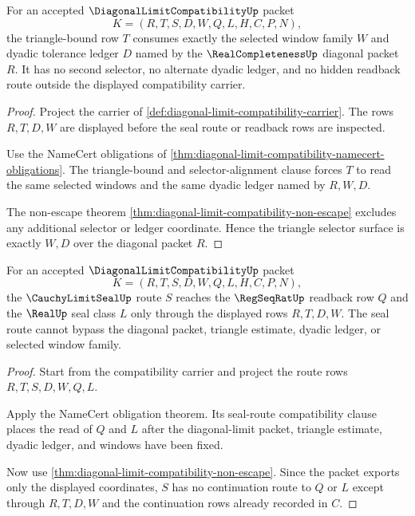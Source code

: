 

\begin{theorem}
\label{thm:diagonal-limit-compatibility-triangle-selector-alignment}
For an accepted $\DiagonalLimitCompatibilityUp$ packet
$$
K=(R,T,S,D,W,Q,L,H,C,P,N),
$$
the triangle-bound row $T$ consumes exactly the selected window family $W$ and dyadic tolerance ledger $D$ named by the $\RealCompletenessUp$ diagonal packet $R$. It has no second selector, no alternate dyadic ledger, and no hidden readback route outside the displayed compatibility carrier.
\end{theorem}
\begin{proof}
Project the carrier of \autoref{def:diagonal-limit-compatibility-carrier}. The rows $R,T,D,W$ are displayed before the seal route or readback rows are inspected.

Use the NameCert obligations of \autoref{thm:diagonal-limit-compatibility-namecert-obligations}. The triangle-bound and selector-alignment clause forces $T$ to read the same selected windows and the same dyadic ledger named by $R,W,D$.

The non-escape theorem \autoref{thm:diagonal-limit-compatibility-non-escape} excludes any additional selector or ledger coordinate. Hence the triangle selector surface is exactly $W,D$ over the diagonal packet $R$.
\end{proof}

\begin{theorem}
\label{thm:diagonal-limit-compatibility-seal-route-compatibility}
For an accepted $\DiagonalLimitCompatibilityUp$ packet
$$
K=(R,T,S,D,W,Q,L,H,C,P,N),
$$
the $\CauchyLimitSealUp$ route $S$ reaches the $\RegSeqRatUp$ readback row $Q$ and the $\RealUp$ seal class $L$ only through the displayed rows $R,T,D,W$. The seal route cannot bypass the diagonal packet, triangle estimate, dyadic ledger, or selected window family.
\end{theorem}
\begin{proof}
Start from the compatibility carrier and project the route rows $R,T,S,D,W,Q,L$.

Apply the NameCert obligation theorem. Its seal-route compatibility clause places the read of $Q$ and $L$ after the diagonal-limit packet, triangle estimate, dyadic ledger, and windows have been fixed.

Now use \autoref{thm:diagonal-limit-compatibility-non-escape}. Since the packet exports only the displayed coordinates, $S$ has no continuation route to $Q$ or $L$ except through $R,T,D,W$ and the continuation rows already recorded in $C$.
\end{proof}

